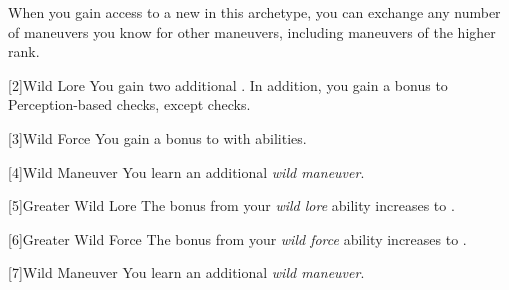         When you gain access to a new  in this archetype,
            you can exchange any number of maneuvers you know for other maneuvers,
            including maneuvers of the higher rank.

        [2]{Wild Lore} You gain two additional .
        In addition, you gain a  bonus to Perception-based checks, except  checks.

        [3]{Wild Force} You gain a  bonus to  with  abilities.

        [4]{Wild Maneuver}
        You learn an additional \textit{wild maneuver}.

        [5]{Greater Wild Lore} The bonus from your \textit{wild lore} ability increases to .

        [6]{Greater Wild Force} The bonus from your \textit{wild force} ability increases to .

        [7]{Wild Maneuver}
        You learn an additional \textit{wild maneuver}.




\newpage
